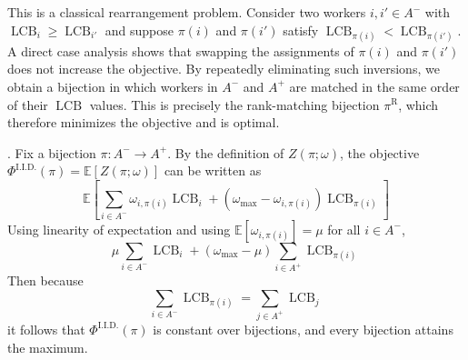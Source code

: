 \documentclass[opre,blindrev]{informs3}
\newcommand{\LCB}{\operatorname{LCB}}
\newcommand{\bE}[1]{{\mathbb{E}\left[#1\right]}}
\begin{document}
\begin{APPENDICES}
    This is a classical rearrangement problem. Consider two workers \(i,i'\in A^-\) with \(\LCB_i \ge \LCB_{i'}\) and suppose \(\pi(i)\) and \(\pi(i')\) satisfy \(\LCB_{\pi(i)} < \LCB_{\pi(i')}\). A direct case analysis shows that swapping the assignments of \(\pi(i)\) and \(\pi(i')\) does not increase the objective. By repeatedly eliminating such inversions, we obtain a bijection in which workers in \(A^-\) and \(A^+\) are matched in the same order of their \(\LCB\) values. This is precisely the rank-matching bijection \(\pi^{\mathrm{R}}\), which therefore minimizes the objective and is optimal.
\Halmos\


. 
    Fix a bijection \(\pi:A^-\to A^+\). By the definition of \(Z(\pi;\omega)\), the objective \(\Phi^{\mathrm{I.I.D.}}(\pi) = \bE{Z(\pi;\omega)}\) can be written as 
    \[\bE{\sum_{i\in A^-}\omega_{i,\pi(i)}\LCB_i + (\omega_{\max}-\omega_{i,\pi(i)})\LCB_{\pi(i)}}\]
    Using linearity of expectation and using \(\bE{\omega_{i,\pi(i)}}=\mu\) for all \(i\in A^-\),
    \[\mu\sum_{i\in A^-}\LCB_i + (\omega_{\max}-\mu)\sum_{i\in A^+}\LCB_{\pi(i)}\]
    Then because 
    \[\sum_{i\in A^-}\LCB_{\pi(i)}=\sum_{j\in A^+}\LCB_j\]
    it follows that \(\Phi^{\mathrm{I.I.D.}}(\pi)\) is constant over bijections, and every bijection attains the maximum.
\Halmos



\end{APPENDICES}
\end{document}
